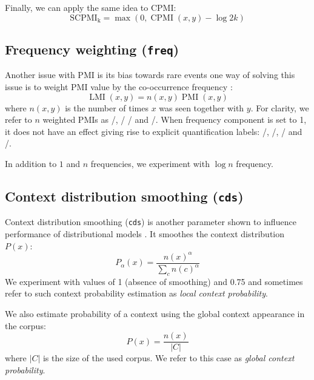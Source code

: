 \documentclass[11pt,letterpaper]{article}
\begin{document}
Finally, we can apply the same idea to CPMI:
%
\begin{equation}
  \label{eq:pcpmi}
  \operatorname{SCPMI_k} = \max (0, \operatorname{CPMI}(x, y) - \log 2k)
\end{equation}

\subsection{Frequency weighting (\texttt{freq})}
\label{sec:frequency-weighting}

Another issue with PMI is its bias towards rare events \cite{TACL570} one way of solving this issue is to weight PMI value by the co-occurrence frequency \cite{Evert05}:
%
\begin{equation}
  \label{eq:lmi}
  \operatorname{LMI}(x, y) = n(x, y)\operatorname{PMI}(x, y)
\end{equation}
%
where $n(x, y)$ is the number of times $x$ was seen together with $y$. For clarity, we refer to $n$ weighted PMIs as \NPMI/, \NSPMI/ \NCPMI/ and \NSCPMI/. When frequency component is set to 1, it does not have an effect giving rise to explicit quantification labels: \PMI/, \SPMI/, \CPMI/ and \SCPMI/.

In addition to $1$ and $n$ frequencies, we experiment with $\log n$ frequency.

\subsection{Context distribution smoothing (\texttt{cds})}
\label{sec:cont-distr-smooth}

Context distribution smoothing (\texttt{cds}) is another parameter shown to influence performance of distributional models \cite{TACL570}. It smoothes the context distribution $P(x)$:
%
\begin{equation}
  \label{eq:cds}
  P_{\alpha}(x) = \frac{n(x)^{\alpha}}{\sum_{c}n(c)^{\alpha}}
\end{equation}
%
We experiment with values of 1 (absence of smoothing) and 0.75 and sometimes refer to such context probability estimation as \emph{local context probability}.

We also estimate probability of a context using the global context appearance in the corpus:
%
\begin{equation}
  \label{eq:cds-nan}
  P(x) = \frac{n(x)}{|C|}
\end{equation}
%
where $|C|$ is the size of the used corpus. We refer to this case as \emph{global context probability}.
\end{document}
